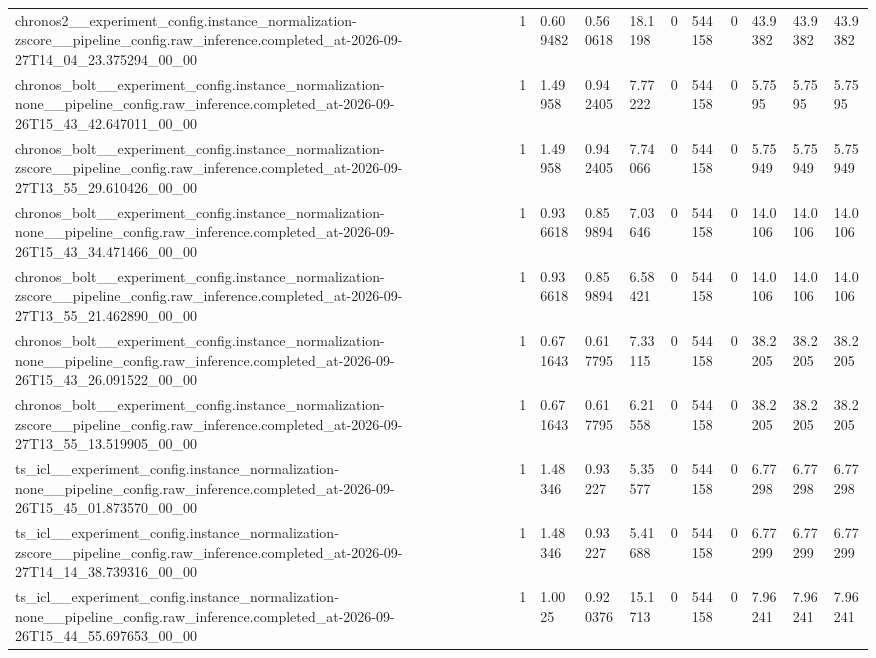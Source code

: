 \begin{tabular}{lllllllllll}
chronos2\_\_experiment\_config.instance\_normalization-zscore\_\_pipeline\_config.raw\_inference.completed\_at-2026-09-27T14\_04\_23.375294\_00\_00 & 1 & 0.609482 & 0.560618 & 18.1198 & 0 & 544158 & 0 & 43.9382 & 43.9382 & 43.9382 \\
chronos\_bolt\_\_experiment\_config.instance\_normalization-none\_\_pipeline\_config.raw\_inference.completed\_at-2026-09-26T15\_43\_42.647011\_00\_00 & 1 & 1.49958 & 0.942405 & 7.77222 & 0 & 544158 & 0 & 5.7595 & 5.7595 & 5.7595 \\
chronos\_bolt\_\_experiment\_config.instance\_normalization-zscore\_\_pipeline\_config.raw\_inference.completed\_at-2026-09-27T13\_55\_29.610426\_00\_00 & 1 & 1.49958 & 0.942405 & 7.74066 & 0 & 544158 & 0 & 5.75949 & 5.75949 & 5.75949 \\
chronos\_bolt\_\_experiment\_config.instance\_normalization-none\_\_pipeline\_config.raw\_inference.completed\_at-2026-09-26T15\_43\_34.471466\_00\_00 & 1 & 0.936618 & 0.859894 & 7.03646 & 0 & 544158 & 0 & 14.0106 & 14.0106 & 14.0106 \\
chronos\_bolt\_\_experiment\_config.instance\_normalization-zscore\_\_pipeline\_config.raw\_inference.completed\_at-2026-09-27T13\_55\_21.462890\_00\_00 & 1 & 0.936618 & 0.859894 & 6.58421 & 0 & 544158 & 0 & 14.0106 & 14.0106 & 14.0106 \\
chronos\_bolt\_\_experiment\_config.instance\_normalization-none\_\_pipeline\_config.raw\_inference.completed\_at-2026-09-26T15\_43\_26.091522\_00\_00 & 1 & 0.671643 & 0.617795 & 7.33115 & 0 & 544158 & 0 & 38.2205 & 38.2205 & 38.2205 \\
chronos\_bolt\_\_experiment\_config.instance\_normalization-zscore\_\_pipeline\_config.raw\_inference.completed\_at-2026-09-27T13\_55\_13.519905\_00\_00 & 1 & 0.671643 & 0.617795 & 6.21558 & 0 & 544158 & 0 & 38.2205 & 38.2205 & 38.2205 \\
ts\_icl\_\_experiment\_config.instance\_normalization-none\_\_pipeline\_config.raw\_inference.completed\_at-2026-09-26T15\_45\_01.873570\_00\_00 & 1 & 1.48346 & 0.93227 & 5.35577 & 0 & 544158 & 0 & 6.77298 & 6.77298 & 6.77298 \\
ts\_icl\_\_experiment\_config.instance\_normalization-zscore\_\_pipeline\_config.raw\_inference.completed\_at-2026-09-27T14\_14\_38.739316\_00\_00 & 1 & 1.48346 & 0.93227 & 5.41688 & 0 & 544158 & 0 & 6.77299 & 6.77299 & 6.77299 \\
ts\_icl\_\_experiment\_config.instance\_normalization-none\_\_pipeline\_config.raw\_inference.completed\_at-2026-09-26T15\_44\_55.697653\_00\_00 & 1 & 1.0025 & 0.920376 & 15.1713 & 0 & 544158 & 0 & 7.96241 & 7.96241 & 7.96241 \\

\end{tabular}
